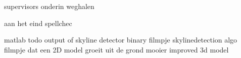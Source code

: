
supervisors onderin weghalen



aan het eind
	spellchec

matlab todo
	output of skyline detector binary
	filmpje skylinedetection algo
	filmpje dat een 2D model groeit uit de grond
	mooier improved 3d model
